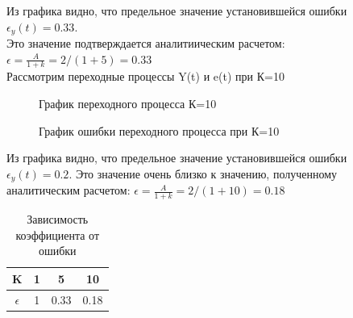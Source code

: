 \documentclass[a4paper, 11pt]{article}
\begin{document}
Из графика видно, что предельное значение установившейся ошибки $\epsilon_y(t)=0.33$.\\
Это значение подтверждается аналитиическим расчетом: $\epsilon=\frac {A}{1+k} = 2/(1+5) = 0.33$\\

Рассмотрим переходные процессы Y(t) и e(t) при К=10
\begin{figure}[h!]
    \caption{График переходного процесса К=10}
    \label{four}
\end{figure}

\newpage 

\begin{figure}[h!]
    \caption{График ошибки переходного процесса при К=10}
    \label{tree}
\end{figure}

\normalsize{Из графика видно, что предельное значение установившейся ошибки $\epsilon_y(t)=0.2$.
Это значение очень близко к значению, полученному аналитическим расчетом: $\epsilon=\frac {A}{1+k} = 2/(1+10) = 0.18$}

\begin{table}[h]
    \begin{center}
    \begin{tabular}{|c|c|c|c|}
    \hline
         K & 1 & 5 & 10 \\
         \hline
         $\epsilon$ & 1 & 0.33 & 0.18 \\
    \hline     
    \end{tabular}
    \caption{Зависимость коэффициента от ошибки}
    \label{tab:my_label}
    \end{center}
\end{table}
\end{document}
